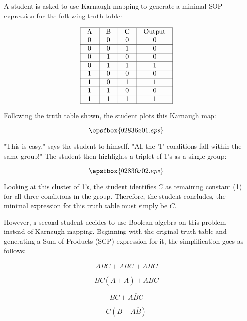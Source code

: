 

A student is asked to use Karnaugh mapping to generate a minimal SOP expression for the following truth table:


$$\vbox{\offinterlineskip
\halign{\strut
\vrule \quad\hfil # \ \hfil & 
\vrule \quad\hfil # \ \hfil & 
\vrule \quad\hfil # \ \hfil & 
\vrule \quad\hfil # \ \hfil \vrule \cr
\noalign{\hrule}
%
A & B & C & Output \cr
%
\noalign{\hrule}
%
0 & 0 & 0 & 0 \cr
%
\noalign{\hrule}
%
0 & 0 & 1 & 0 \cr
%
\noalign{\hrule}
%
0 & 1 & 0 & 0 \cr
%
\noalign{\hrule}
%
0 & 1 & 1 & 1 \cr
%
\noalign{\hrule}
%
1 & 0 & 0 & 0 \cr
%
\noalign{\hrule}
%
1 & 0 & 1 & 1 \cr
%
\noalign{\hrule}
%
1 & 1 & 0 & 0 \cr
%
\noalign{\hrule}
%
1 & 1 & 1 & 1 \cr
%
\noalign{\hrule}
} %
}$$ %

Following the truth table shown, the student plots this Karnaugh map:

$$\epsfbox{02836x01.eps}$$

"This is easy," says the student to himself. "All the '1' conditions fall within the same group!"  The student then highlights a triplet of 1's as a single group:

$$\epsfbox{02836x02.eps}$$

Looking at this cluster of 1's, the student identifies $C$ as remaining constant (1) for all three conditions in the group.  Therefore, the student concludes, the minimal expression for this truth table must simply be $C$.

However, a second student decides to use Boolean algebra on this problem instead of Karnaugh mapping.  Beginning with the original truth table and generating a Sum-of-Products (SOP) expression for it, the simplification goes as follows:

$$\overline{A}BC + A \overline{B}C + ABC$$

$$BC(\overline{A} + A) + A \overline{B}C$$

$$BC + A \overline{B}C$$

$$C(B + A \overline{B})$$

